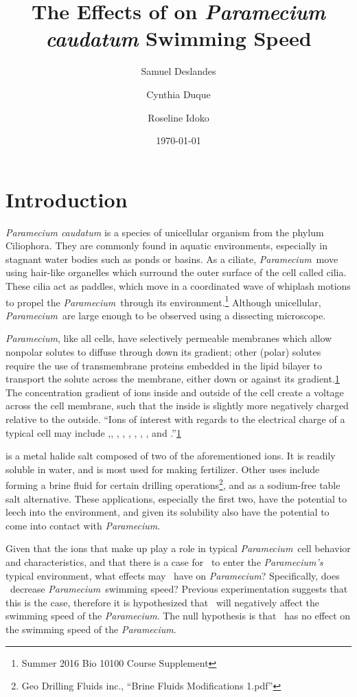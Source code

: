 \documentclass[12pt]{article}
\newcommand{\p}{\textit{Paramecium}}
\newcommand{\kcl}{\ce{KCl}}
\begin{document}
\title{The Effects of  on \textit{Paramecium caudatum} Swimming Speed}
\author{Samuel Deslandes \and Cynthia Duque \and Roseline Idoko}
\date{\today}
\maketitle
\doublespace
\section{Introduction}
	\textit{Paramecium caudatum} is a species of unicellular organism from the phylum Ciliophora. They are commonly found in aquatic environments, especially in stagnant water bodies such as ponds or basins. As a ciliate, \p\ move using hair-like organelles which surround the outer surface of the cell called cilia. These cilia act as paddles, which move in a coordinated wave of whiplash motions to propel the \p\ through its environment.\footnote{\label{first}Summer 2016 Bio 10100 Course Supplement} Although unicellular, \p\ are large enough to be observed using a dissecting microscope.  
	
	\p, like all cells, have selectively permeable membranes which allow nonpolar solutes to diffuse through down its gradient; other (polar) solutes require the use of transmembrane proteins embedded in the lipid bilayer to transport the solute across the membrane, either down or against its gradient.\cref{first} The concentration gradient of ions inside and outside of the cell create a voltage across the cell membrane, such that the inside is slightly more negatively charged relative to the outside. ``Ions of interest with regards to the electrical charge of a typical cell may include ,, , , , , , , and .''\cref{first}
		 
	 is a metal halide salt composed of two of the aforementioned ions. It is readily soluble in water, and is most used for making fertilizer. Other uses include forming a brine fluid for certain drilling operations\footnote{Geo Drilling Fluids inc., ``Brine Fluids Modifications 1.pdf''}, and as a sodium-free table salt alternative. These applications, especially the first two, have the potential to leech into the environment, and given its solubility also have the potential to come into contact with \p.
	
	Given that the ions that make up  play a role in typical \p\ cell behavior and characteristics, and that there is a case for \kcl\ to enter the \textit{Paramecium's} typical environment, what effects may \kcl\ have on \p? Specifically, does \kcl\ decrease \p\ swimming speed? Previous experimentation suggests that this is the case, therefore it is hypothesized that \kcl\ will negatively affect the swimming speed of the \p. The null hypothesis is that \kcl\ has no effect on the swimming speed of the \p.   
	
\end{document}
